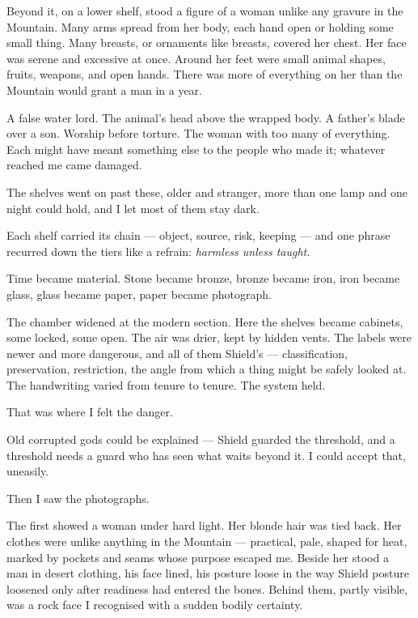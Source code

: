 Beyond it, on a lower shelf, stood a figure of a woman unlike any gravure in the Mountain. Many arms spread from her body, each hand open or holding some small thing. Many breasts, or ornaments like breasts, covered her chest. Her face was serene and excessive at once. Around her feet were small animal shapes, fruits, weapons, and open hands. There was more of everything on her than the Mountain would grant a man in a year.\par

A false water lord. The animal's head above the wrapped body. A father's blade over a son. Worship before torture. The woman with too many of everything. Each might have meant something else to the people who made it; whatever reached me came damaged.\par

The shelves went on past these, older and stranger, more than one lamp and one night could hold, and I let most of them stay dark.\par

Each shelf carried its chain --- object, source, risk, keeping --- and one phrase recurred down the tiers like a refrain: \textit{harmless unless taught.}\par

Time became material. Stone became bronze, bronze became iron, iron became glass, glass became paper, paper became photograph.\par

The chamber widened at the modern section. Here the shelves became cabinets, some locked, some open. The air was drier, kept by hidden vents. The labels were newer and more dangerous, and all of them Shield's --- classification, preservation, restriction, the angle from which a thing might be safely looked at. The handwriting varied from tenure to tenure. The system held.\par

That was where I felt the danger.\par

Old corrupted gods could be explained --- Shield guarded the threshold, and a threshold needs a guard who has seen what waits beyond it. I could accept that, uneasily.\par

Then I saw the photographs.\par

The first showed a woman under hard light. Her blonde hair was tied back. Her clothes were unlike anything in the Mountain --- practical, pale, shaped for heat, marked by pockets and seams whose purpose escaped me. Beside her stood a man in desert clothing, his face lined, his posture loose in the way Shield posture loosened only after readiness had entered the bones. Behind them, partly visible, was a rock face I recognised with a sudden bodily certainty.\par

